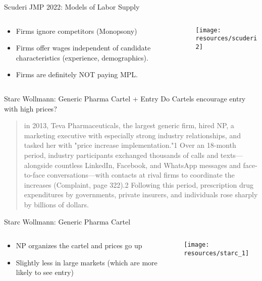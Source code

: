 \documentclass[aspectratio=169,10pt]{beamer}
\begin{document}
\begin{frame}{Scuderi JMP 2022: Models of Labor Supply}
\begin{columns}
\begin{column}{0.5\textwidth}
\begin{itemize}
\item Firms ignore competitors (Monopsony)
\item Firms offer wages independent of candidate characteristics (experience, demographics).
\item Firms are definitely NOT paying MPL.
\end{itemize}
\end{column}
\begin{column}{0.5\textwidth}
\texttt{[image: resources/scuderi2]}
\end{column}
\end{columns}
\end{frame}

\begin{frame}{Starc Wollmann: Generic Pharma Cartel + Entry}
Do Cartels encourage entry with high prices?\\
\vspace{0.25cm}
\begin{quote}
in 2013, Teva Pharmaceuticals, the largest generic firm, hired NP, a marketing executive with especially strong industry relationships, and tasked her with "price increase implementation."1 Over an 18-month period, industry participants exchanged thousands of calls and texts—alongside countless LinkedIn, Facebook, and WhatsApp messages and face-to-face conversations—with contacts at rival firms to coordinate the increases (Complaint, page 322).2 Following this period, prescription drug expenditures by governments, private insurers, and individuals rose sharply by billions of dollars.
\end{quote}
\end{frame}



\begin{frame}{Starc Wollmann: Generic Pharma Cartel }
\begin{columns}
\begin{column}{0.5\textwidth}
\begin{itemize}
\item NP organizes the cartel and prices go up
\item Slightly less in large markets (which are more likely to see entry)
\end{itemize}
\end{column}
\begin{column}{0.5\textwidth}
\texttt{[image: resources/starc\_1]}
\end{column}
\end{columns}
\end{frame}
\end{document}

